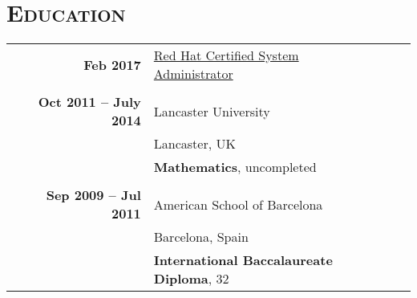 \documentclass[a4paper,10pt]{article} %
\begin{document}
\section{\textsc{Education}}
\begin{tabularx}{\textwidth}{XrlXr}
&  \textbf{Feb 2017}                & \href{https://www.redhat.com/rhtapps/certification/verify/?certId=170-025-027\&isSearch=False\&verify=Verify}{Red Hat Certified System Administrator} & &\\
\multicolumn{5}{c}{}\\ %
  &  \textbf{Oct 2011 -- July 2014} & Lancaster University & &\\
  &                                 & Lancaster, UK & & \\
  &                                 & \textbf{Mathematics}, uncompleted & &\\
\multicolumn{5}{c}{}\\ %
  &  \textbf{Sep 2009 -- Jul 2011}  & American School of Barcelona & &\\
  &                                 & Barcelona, Spain & &\\
  &                                 & \textbf{International Baccalaureate Diploma}, 32 & &\\
\end{tabularx}


\medskip
\end{document}
